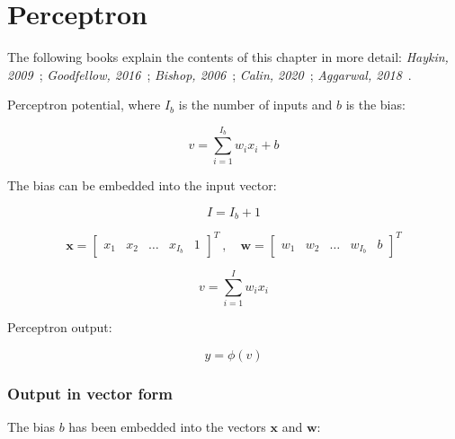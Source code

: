 
\chapter{Perceptron}\label{ch:perceptron}

The following books explain the contents of this chapter in more detail: \textit{Haykin, 2009}~\cite{HaykinNeural2009};
\textit{Goodfellow, 2016}~\cite{GoodfellowDeep2016}; \textit{Bishop, 2006}~\cite{BishopPattern2006};
\textit{Calin, 2020}~\cite{CalinDeep2020}; \textit{Aggarwal, 2018}~\cite{AggarwalNeural2018}.

Perceptron potential, where $I_b$ is the number of inputs and $b$ is the bias:

\begin{equation}\label{eq:perceptron-potential}
    v = \sum_{i=1}^{I_b} w_i x_i + b
\end{equation}

The bias can be embedded into the input vector:

\begin{equation}\label{eq:m-plus-one-0}
    I = I_b + 1
\end{equation}

\begin{equation}\label{eq:perceptron-potential-2}
    \bm{x} =
    \begin{bmatrix}
        x_1 & x_2 & \ldots & x_{I_b} & 1
    \end{bmatrix}^T \ , \quad
    \bm{w} =
    \begin{bmatrix}
        w_1 & w_2 & \ldots & w_{I_b} & b
    \end{bmatrix}^T
\end{equation}

\begin{equation}\label{eq:perceptron-potential-3}
v = \sum_{i=1}^{I} w_i x_i
\end{equation}

Perceptron output:

\begin{equation}\label{eq:perceptron-output}
    y = \phi (v)
\end{equation}


\subsection{Output in vector form}\label{subsec:vector-form}

The bias $b$ has been embedded into the vectors $\bm{x}$ and $\bm{w}$:

